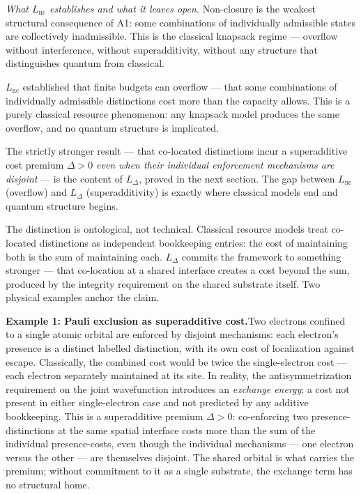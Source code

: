 \documentclass[11pt]{article}
\theoremstyle{remark}
\begin{document}
\noindent\textit{What $L_{\mathrm{nc}}$ establishes and what it leaves open.}  Non-closure is the weakest structural consequence of A1: some combinations of individually admissible states are collectively inadmissible.  This is the classical knapsack regime --- overflow without interference, without superadditivity, without any structure that distinguishes quantum from classical.

\medskip

\begin{tcolorbox}[apfbox, title={The gap between $L_{\mathrm{nc}}$ and $L_\Delta$: where classical models end}]
$L_{\mathrm{nc}}$ established that finite budgets can overflow --- that some combinations of individually admissible distinctions cost more than the capacity allows.  This is a purely classical resource phenomenon: any knapsack model produces the same overflow, and no quantum structure is implicated.

\smallskip\noindent The strictly stronger result --- that co-located distinctions incur a superadditive cost premium $\Delta > 0$ \emph{even when their individual enforcement mechanisms are disjoint} --- is the content of $L_\Delta$, proved in the next section.  The gap between $L_{\mathrm{nc}}$ (overflow) and $L_\Delta$ (superadditivity) is exactly where classical models end and quantum structure begins.

\smallskip\noindent The distinction is ontological, not technical.  Classical resource models treat co-located distinctions as independent bookkeeping entries: the cost of maintaining both is the sum of maintaining each.  $L_\Delta$ commits the framework to something stronger --- that co-location at a shared interface creates a cost beyond the sum, produced by the integrity requirement on the shared substrate itself.  Two physical examples anchor the claim.

\smallskip\noindent\textbf{Example 1: Pauli exclusion as superadditive cost.}\quad Two electrons confined to a single atomic orbital are enforced by disjoint mechanisms: each electron's presence is a distinct labelled distinction, with its own cost of localization against escape.  Classically, the combined cost would be twice the single-electron cost --- each electron separately maintained at its site.  In reality, the antisymmetrization requirement on the joint wavefunction introduces an \emph{exchange energy}: a cost not present in either single-electron case and not predicted by any additive bookkeeping.  This is a superadditive premium $\Delta > 0$: co-enforcing two presence-distinctions at the same spatial interface costs more than the sum of the individual presence-costs, even though the individual mechanisms --- one electron versus the other --- are themselves disjoint.  The shared orbital is what carries the premium; without commitment to it as a single substrate, the exchange term has no structural home.


\end{tcolorbox}
\end{document}
